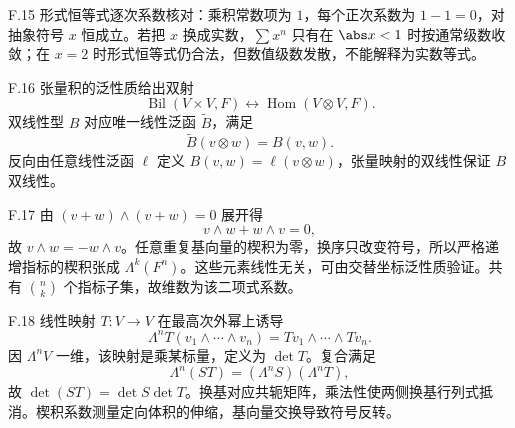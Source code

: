 \begin{solution}{F.15}
形式恒等式逐次系数核对：乘积常数项为 \(1\)，每个正次系数为 \(1-1=0\)，对抽象符号 \(x\) 恒成立。若把 \(x\) 换成实数，\(\sum x^n\) 只有在 \(\abs x<1\) 时按通常级数收敛；在 \(x=2\) 时形式恒等式仍合法，但数值级数发散，不能解释为实数等式。
\end{solution}

\begin{solution}{F.16}
张量积的泛性质给出双射
\[
 \operatorname{Bil}(V\times V,F)
 \longleftrightarrow
 \operatorname{Hom}(V\otimes V,F).
\]
双线性型 \(B\) 对应唯一线性泛函 \(\widetilde B\)，满足
\[
 \widetilde B(v\otimes w)=B(v,w).
\]
反向由任意线性泛函 \(\ell\) 定义 \(B(v,w)=\ell(v\otimes w)\)，张量映射的双线性保证 \(B\) 双线性。
\end{solution}

\begin{solution}{F.17}
由 \((v+w)\wedge(v+w)=0\) 展开得
\[
 v\wedge w+w\wedge v=0,
\]
故 \(v\wedge w=-w\wedge v\)。任意重复基向量的楔积为零，换序只改变符号，所以严格递增指标的楔积张成 \(\Lambda^k(F^n)\)。这些元素线性无关，可由交替坐标泛性质验证。共有 \(\binom nk\) 个指标子集，故维数为该二项式系数。
\end{solution}

\begin{solution}{F.18}
线性映射 \(T:V\to V\) 在最高次外幂上诱导
\[
 \Lambda^nT(v_1\wedge\cdots\wedge v_n)
 =Tv_1\wedge\cdots\wedge Tv_n.
\]
因 \(\Lambda^nV\) 一维，该映射是乘某标量，定义为 \(\det T\)。复合满足
\[
 \Lambda^n(ST)=(\Lambda^nS)(\Lambda^nT),
\]
故 \(\det(ST)=\det S\det T\)。换基对应共轭矩阵，乘法性使两侧换基行列式抵消。楔积系数测量定向体积的伸缩，基向量交换导致符号反转。
\end{solution}
